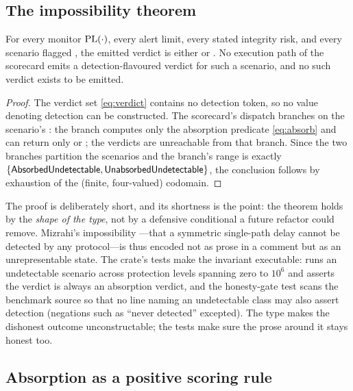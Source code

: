 \subsection{The impossibility theorem}
\label{sec:impossibility}

\begin{theorem}
\label{thm:invariant}
For every monitor $\mathrm{PL}(\cdot)$, every alert limit, every stated integrity risk,
and every scenario flagged , the emitted verdict is either
\Absorbed{} or \Unabsorbed{}. No execution path of the scorecard emits a
detection-flavoured verdict for such a scenario, and no such verdict exists to be
emitted.
\end{theorem}

\begin{proof}
The verdict set \eqref{eq:verdict} contains no detection token, so no value
denoting detection can be constructed. The scorecard's dispatch branches on the
scenario's : the  branch computes only the
absorption predicate \eqref{eq:absorb} and can return only \Absorbed{} or
\Unabsorbed{}; the  verdicts are unreachable from that branch. Since
the two branches partition the scenarios and the  branch's range
is exactly $\{\textsf{AbsorbedUndetectable}{},\textsf{UnabsorbedUndetectable}{}\}$, the conclusion follows by exhaustion of
the (finite, four-valued) codomain.
\end{proof}

The proof is deliberately short, and its shortness is the point: the theorem holds
by the \emph{shape of the type}, not by a defensive conditional a future refactor
could remove. Mizrahi's impossibility \citep{mizrahi7384}---that a symmetric
single-path delay cannot be detected by any protocol---is thus encoded not as prose
in a comment but as an unrepresentable state. The crate's tests make the invariant
executable:  runs an
undetectable scenario across protection levels spanning zero to $10^{6}$ and
asserts the verdict is always an absorption verdict, and the honesty-gate test
 scans the benchmark
source so that no line naming an undetectable class may also assert detection
(negations such as ``never detected'' excepted). The type makes the dishonest
outcome unconstructable; the tests make sure the prose around it stays honest too.

\subsection{Absorption as a positive scoring rule}
\label{sec:absorptionrule}

